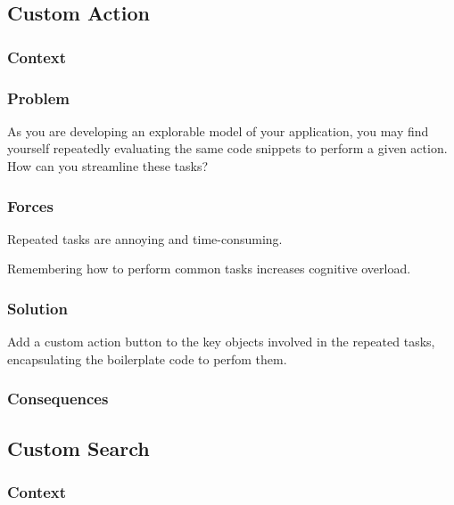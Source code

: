 \documentclass[sigconf]{acmart}
\begin{document}
\subsection*{Custom Action}\label{pat:customAction}
\subsubsection*{Context}
\subsubsection*{Problem}

As you are developing an explorable model of your application, you may find yourself repeatedly evaluating the same code snippets to perform a given action. How can you streamline these tasks?


\subsubsection*{Forces}

Repeated tasks are annoying and time-consuming.

Remembering how to perform common tasks increases cognitive overload.



\subsubsection*{Solution}

Add a custom action button to the key objects involved in the repeated tasks, encapsulating the boilerplate code to perfom them.



\subsubsection*{Consequences}


\subsection*{Custom Search}\label{pat:customSearch}
\subsubsection*{Context}
\end{document}
